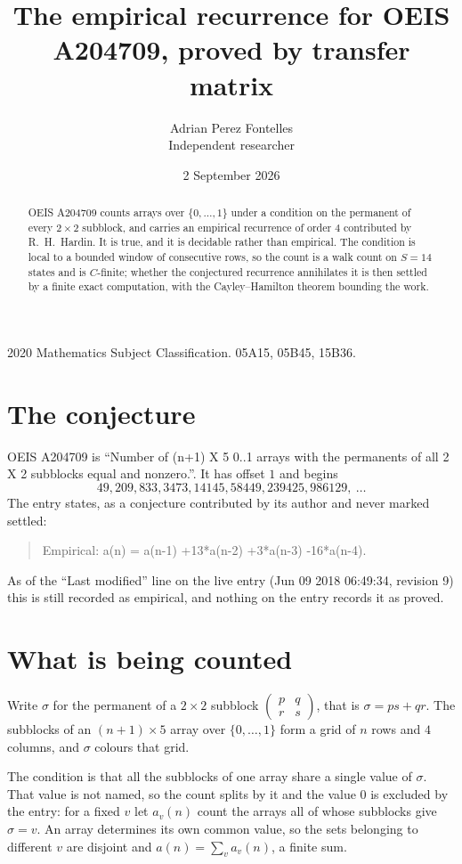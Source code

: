 \documentclass[11pt,a4paper]{article}
\title{The empirical recurrence for OEIS A204709, proved by transfer matrix}
\author{Adrian Perez Fontelles\\ \small Independent researcher}
\date{2 September 2026}
\theoremstyle{plain}
\theoremstyle{definition}
\begin{document}
\maketitle

\begin{abstract}
OEIS A204709 counts arrays over $\{0,\dots,1\}$ under a condition on the permanent of every
$2\times2$ subblock, and carries an empirical recurrence of order $4$ contributed by
R.~H.~Hardin. It is true, and it is decidable rather than empirical. The condition is local to
a bounded window of consecutive rows, so the count is a walk count on $S=14$ states and is
$C$-finite; whether the conjectured recurrence annihilates it is then settled by a finite exact
computation, with the Cayley--Hamilton theorem bounding the work.
\end{abstract}

\noindent\small 2020 Mathematics Subject Classification. 05A15, 05B45, 15B36.\normalsize

\section{The conjecture}

OEIS A204709 is ``Number of (n+1) X 5 0..1 arrays with the permanents of all 2 X 2 subblocks equal and nonzero.''. It has offset $1$ and begins
\[
49, 209, 833, 3473, 14145, 58449, 239425, 986129,\ \dots
\]
The entry states, as a conjecture contributed by its author and never marked settled:
\begin{quote}
Empirical: a(n) = a(n-1) +13*a(n-2) +3*a(n-3) -16*a(n-4).
\end{quote}
As of the ``Last modified'' line on the live entry (Jun 09 2018 06:49:34, revision 9) this is still
recorded as empirical, and nothing on the entry records it as proved.

\section{What is being counted}

Write $\sigma$ for the permanent of a $2\times2$ subblock
$\begin{pmatrix}p&q\\r&s\end{pmatrix}$, that is $\sigma=ps+qr$. The subblocks of an
$(n+1)\times5$ array over $\{0,\dots,1\}$ form a grid of $n$ rows and $4$
columns, and $\sigma$ colours that grid.

The condition is that all the subblocks of one array share a single value of $\sigma$. That
value is not named, so the count splits by it and the value $0$ is excluded by the entry: for a fixed $v$ let $a_v(n)$ count the
arrays all of whose subblocks give $\sigma=v$. An array determines its own common value, so
the sets belonging to different $v$ are disjoint and $a(n)=\sum_v a_v(n)$, a finite sum.
\end{document}
